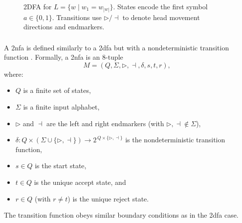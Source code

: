 \begin{figure}[ht]
    \centering  
    \caption{2DFA for \(L = \{w \mid w_1 = w_{|w|}\}\). States encode the first symbol \(a \in \{0,1\}\). Transitions use \(\triangleright/\dashv\) to denote head movement directions and endmarkers.}
    \label{fig:2dfa-example}
\end{figure}


\subsubsection{}
\label{subsubsec:2nfa}

\begin{definition}
A \gls{2nfa} is defined similarly to a \gls{2dfa} but with a nondeterministic transition function \cite{sakoda1978nfas}. Formally, a \gls{2nfa} is an 8-tuple
\[
M = (Q, \Sigma, \triangleright, \dashv, \delta, s, t, r),
\]
where:
\begin{itemize}
    \item \(Q\) is a finite set of states,
    \item \(\Sigma\) is a finite input alphabet,
    \item \(\triangleright\) and \(\dashv\) are the left and right endmarkers (with \(\triangleright,\dashv \notin \Sigma\)),
    \item \(\delta: Q \times (\Sigma \cup \{\triangleright,\dashv\}) \to 2^{\,Q \times \{\triangleright,\dashv\}}\) is the nondeterministic transition function,
    \item \(s\in Q\) is the start state,
    \item \(t\in Q\) is the unique accept state, and
    \item \(r\in Q\) (with \(r\neq t\)) is the unique reject state.
\end{itemize}
The transition function obeys similar boundary conditions as in the \gls{2dfa} case.
\end{definition}

